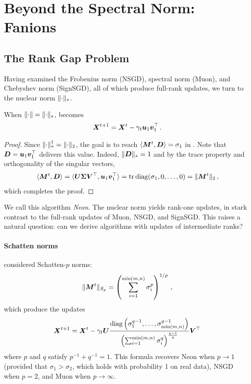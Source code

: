 \documentclass[pmlr]{jmlr}%
\newcommand{\norm}[1]{\lVert #1\rVert}
\DeclarePairedDelimiter{\norms}{\|}{\|_{\mathrm{2}}}
\DeclarePairedDelimiter{\normn}{\|}{\|_{*}}
\def\<#1,#2>{\langle #1,#2\rangle}
\DeclareMathOperator{\tr}{tr}
\DeclareMathOperator{\diag}{diag}
\begin{document}
 \section{Beyond the Spectral Norm: Fanions}
 
 \subsection{The Rank Gap Problem}
 
 Having examined the Frobenius norm (NSGD), spectral norm (Muon), and Chebyshev norm (SignSGD), all of which produce full-rank updates, we turn to the nuclear norm $\normn{\cdot}$.
 
 \begin{lemma}\label{lemma:neon_update}
   When $\norm{\cdot} = \normn{\cdot}$,  becomes
   \begin{equation}\label{eq:neon_update}
     {\bm{X}}^{t+1} = {\bm{X}}^{t} - \gamma_t {\bm{u}}_1 {\bm{v}}_1^\top\,.
   \end{equation}
 \end{lemma}
 \begin{proof}
 Since $\normn{\cdot}^\dagger = \norms{\cdot}$, the goal is to reach $\<\mM^t, \mD> = \sigma_1$ in . Note that ${\bm{D}} = {\bm{u}}_1 {\bm{v}}_1^\top$ delivers this value. Indeed, $\normn{\mD}=1$ and by the trace property and orthogonality of the singular vectors,
 \[
 \<\mM^t, \mD> =\<\mU \mSigma \mV^\top, \vu_1 \vv_1^\top> = \tr \diag({\sigma_1, 0, \dots, 0}) = \norms{\mM^t}\,,
 \]
 which completes the proof.
 \end{proof}
 
 We call this algorithm \emph{Neon}. The nuclear norm yields rank-one updates, in stark contrast to the full-rank updates of Muon, NSGD, and SignSGD. This raises a natural question: can we derive algorithms with updates of intermediate ranks?
 
 \paragraph{Schatten norms}
 \citet{cesista2025schattenp} considered Schatten-$p$ norms:
 \[\norm{\mM^t}_{S_p} = \left(\sum_{i=1}^{\min(m, n)}\sigma_i^p\right)^{1/p}\,,
 \]
 which produce the updates
 \[
 \mX^{t+1} = \mX^t - \gamma_t \mU \frac{\diag\left(\sigma_1^{q-1},\dots, \sigma_{\min(m,n)}^{q-1}\right)}{\left(\sum_{i=1}^{\min(m,n)}{\sigma_i^q}\right)^{\frac{q-1}{q}}}\mV^\top
 \]
 where $p$ and $q$ satisfy $p^{-1} + q^{-1} = 1$. This formula recovers Neon when $p\rightarrow1$ (provided that $\sigma_1 > \sigma_2$, which holds with probability 1 on real data), NSGD when $p=2$, and Muon when $p\rightarrow\infty$.
 
\end{document}
